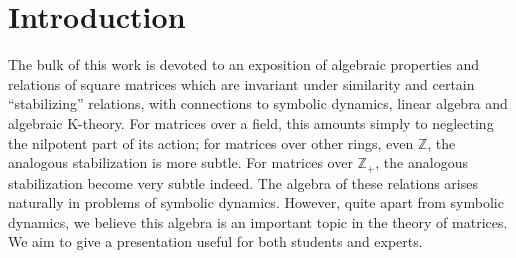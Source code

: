 \documentclass{amsart}
\theoremstyle{definition}
\theoremstyle{definition}
\newcommand{\Z}{\mathbb Z}
\numberwithin{equation}{subsection}
\begin{document}



\tableofcontents

\addtocounter{section}{-1}
\section{Introduction}









The bulk of this work is devoted to
 an exposition  of  algebraic properties
and relations of square
matrices which are invariant under
similarity and certain
``stabilizing'' relations,
with  connections to symbolic dynamics, linear algebra and
algebraic K-theory.
For matrices over a field, this amounts simply to neglecting
the nilpotent part of its action; for matrices over other rings,
even $\Z$,
the analogous stabilization is  more subtle. For matrices over
$\Z_+$, the analogous stabilization
become very subtle indeed.
The  algebra of these relations
arises naturally in problems of
symbolic dynamics.
However, quite apart from symbolic dynamics, we believe
this algebra is an important topic in the theory of matrices.
We aim to give a presentation useful for both students and
experts.
\end{document}
